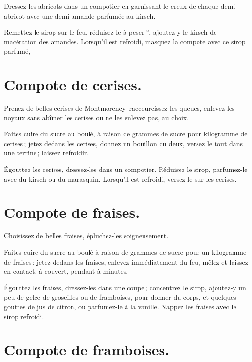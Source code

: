 Dressez les abricots dans un compotier en garnissant le creux de chaque
demi-abricot avec une demi-amande parfumée au kirsch.

Remettez le sirop sur le feu, réduisez-le à peser {\mmm}°, ajoutez‑y le
kirsch de macération des amandes. Lorsqu'il est refroidi, masquez la compote
avec ce sirop parfumé,

\section*{\centering Compote de cerises.}
{}

Prenez de belles cerises de Montmorency, raccourcissez les queues, enlevez les
noyaux sans abîmer les cerises ou ne les enlevez pas, au choix.

Faites cuire du sucre au boulé, à raison de {\mmm} grammes de sucre pour
{\mmm} kilogramme de cerises ; jetez dedans les cerises, donnez un
bouillon ou deux, versez le tout dans une terrine ; laissez refroidir.

Égouttez les cerises, dressez-les dans un compotier. Réduisez le sirop,
parfumez-le avec du kirsch ou du marasquin. Lorsqu'il est refroidi, versez-le
sur les cerises.

\section*{\centering Compote de fraises.}
{}

Choisissez de belles fraises, épluchez-les soignensement.

Faites cuire du sucre au boulé à raison de {\mmm} grammes de sucre pour
un kilogramme de fraises ; jetez dedans les fraises, enlevez immédiatement du
feu, mêlez et laissez en contact, à couvert, pendant {\mmm}
à {\mmm} minutes.

Égouttez les fraises, dressez-les dans une coupe ; concentrez le sirop,
ajoutez‑y un peu de gelée de groseilles ou de framboises, pour donner du corps,
et quelques gouttes de jus de citron, ou parfumez-le à la vanille. Nappez les
fraises avec le sirop refroidi.

\section*{\centering Compote de framboises.}
{}

